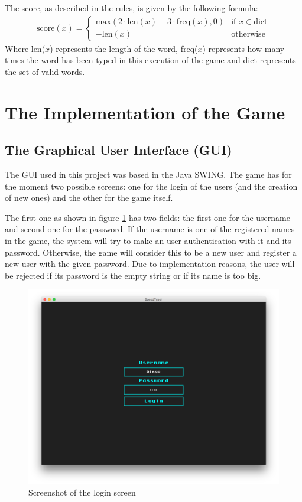 \documentclass[a4paper,12pt,twoside]{article}
\begin{document}
				The score, as described in the rules, is given by the following formula:
				\begin{gather*}
					    \mbox{score}(x)= 
					    \begin{cases}
						    \mbox{max}(2\cdot\mbox{len}(x)-3\cdot\mbox{freq}(x), 0) & \text{if } x \in \mbox{dict}\\
						    -\mbox{len}(x) & \text{otherwise}
					    \end{cases}
				\end{gather*}
				Where len($x$) represents the length of the word, freq($x$) represents how many times the word has been typed in this execution of the game and dict represents the set of valid words.
	
	\section{The Implementation of the Game}
		
		\subsection{The Graphical User Interface (GUI)}
		
			The GUI used in this project was based in the Java SWING. The game has for the moment two possible screens: one for the login of the users (and the creation of new ones) and the other for the game itself.
			
			The first one as shown in figure \ref{fig:login} has two fields: the first one for the username and second one for the password. If the username is one of the registered names in the game, the system will try to make an user authentication with it and its password. Otherwise, the game will consider this to be a new user and register a new user with the given password. Due to implementation reasons, the user will be rejected if its password is the empty string or if its name is too big.
			
			\begin{figure}[H]
				\centering
				\includegraphics[width=0.7\columnwidth]{../screenshots/login.png}%
				\caption{Screenshot of the login screen}%
				\label{fig:login}%
			\end{figure}
			
\end{document}
